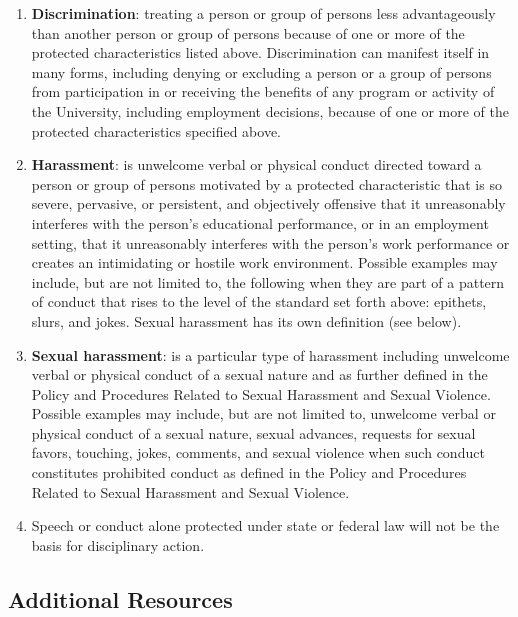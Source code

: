 \begin{enumerate}

	\item \textbf{Discrimination}: treating a person or group of persons less advantageously than another person or group of persons because of one or more of the protected characteristics listed above. Discrimination can manifest itself in many forms, including denying or excluding a person or a group of persons from participation in or receiving the benefits of any program or activity of the University, including employment decisions, because of one or more of the protected characteristics specified above.

	\item \textbf{Harassment}: is unwelcome verbal or physical conduct directed toward a person or group of persons motivated by a protected characteristic that is so severe, pervasive, or persistent, and objectively offensive that it unreasonably interferes with the person’s educational performance, or in an employment setting, that it unreasonably interferes with the person’s work performance or creates an intimidating or hostile work environment. Possible examples may include, but are not limited to, the following when they are part of a pattern of conduct that rises to the level of the standard set forth above: epithets, slurs, and jokes. Sexual harassment has its own definition (see below).

	\item \textbf{Sexual harassment}: is a particular type of harassment including unwelcome verbal or physical conduct of a sexual nature and as further defined in the Policy and Procedures Related to Sexual Harassment and Sexual Violence. Possible examples may include, but are not limited to, unwelcome verbal or physical conduct of a sexual nature, sexual advances, requests for sexual favors, touching, jokes, comments, and sexual violence when such conduct constitutes prohibited conduct as defined in the Policy and Procedures Related to Sexual Harassment and Sexual Violence.

	\item Speech or conduct alone protected under state or federal law will not be the basis for disciplinary action.
\end{enumerate}

\subsection*{Additional Resources}

